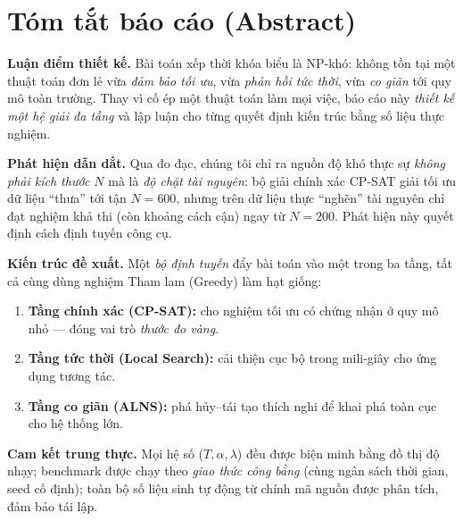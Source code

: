 \documentclass[11pt,a4paper]{article}
\begin{document}
\newpage

\tableofcontents
\newpage

\section*{Tóm tắt báo cáo (Abstract)}

\noindent\textbf{Luận điểm thiết kế.} Bài toán xếp thời khóa biểu là NP-khó: không
tồn tại một thuật toán đơn lẻ vừa \emph{đảm bảo tối ưu}, vừa \emph{phản hồi tức
thời}, vừa \emph{co giãn} tới quy mô toàn trường. Thay vì cố ép một thuật toán làm
mọi việc, báo cáo này \emph{thiết kế một hệ giải đa tầng} và lập luận cho từng
quyết định kiến trúc bằng số liệu thực nghiệm.

\medskip\noindent\textbf{Phát hiện dẫn dắt.} Qua đo đạc, chúng tôi chỉ ra nguồn độ
khó thực sự \emph{không phải kích thước $N$} mà là \emph{độ chặt tài nguyên}: bộ
giải chính xác CP-SAT giải tối ưu dữ liệu ``thưa'' tới tận $N=600$, nhưng trên dữ
liệu thực ``nghẽn'' tài nguyên chỉ đạt nghiệm khả thi (còn khoảng cách cận) ngay từ
$N=200$. Phát hiện này quyết định cách định tuyến công cụ.

\medskip\noindent\textbf{Kiến trúc đề xuất.} Một \emph{bộ định tuyến} đẩy bài toán
vào một trong ba tầng, tất cả cùng dùng nghiệm Tham lam (Greedy) làm hạt giống:
\begin{enumerate}[label=\arabic*.,leftmargin=*]
  \item \textbf{Tầng chính xác (CP-SAT):} cho nghiệm tối ưu có chứng nhận ở quy mô
  nhỏ --- đóng vai trò \emph{thước đo vàng}.
  \item \textbf{Tầng tức thời (Local Search):} cải thiện cục bộ trong mili-giây
  cho ứng dụng tương tác.
  \item \textbf{Tầng co giãn (ALNS):} phá hủy--tái tạo thích nghi để khai phá toàn
  cục cho hệ thống lớn.
\end{enumerate}

\medskip\noindent\textbf{Cam kết trung thực.} Mọi hệ số ($T,\alpha,\lambda$) đều
được biện minh bằng đồ thị độ nhạy; benchmark được chạy theo \emph{giao thức công
bằng} (cùng ngân sách thời gian, seed cố định); toàn bộ số liệu sinh tự động từ
chính mã nguồn được phân tích, đảm bảo tái lập.












\end{document}
